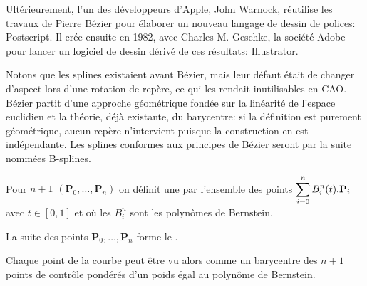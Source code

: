 \begin{histoire}
Ultérieurement, l'un des développeurs d'Apple, John Warnock, 
réutilise les travaux de Pierre Bézier pour élaborer un nouveau langage de dessin de polices: Postscript.
Il crée ensuite en 1982, avec Charles M. Geschke, 
la société Adobe pour lancer un logiciel de dessin dérivé de ces résultats: Illustrator.

\medskip
Notons que les splines existaient avant Bézier,
mais leur défaut était de changer d'aspect lors d'une rotation de repère, ce qui les rendait inutilisables 
en CAO. 
Bézier partit d'une approche géométrique fondée sur la linéarité de l'espace euclidien et la 
théorie, déjà existante, du barycentre: si la définition est purement géométrique, aucun 
repère n'intervient puisque la construction en est indépendante.
Les splines conformes aux principes de Bézier seront par la suite nommées B-splines.
\end{histoire}

\medskip
Pour $n+1$  $(\mathbf{P}_0, \dots, \mathbf{P}_n)$ on définit 
une  par l'ensemble des points $\displaystyle\sum_{i = 0}^n B_i^n(t) . \mathbf{P}_i$ 
avec $t \in[0, 1]$ et où les $B_i^n$ sont les polynômes de Bernstein.

La suite des points $\mathbf{P}_0, \dots, \mathbf{P}_n$ forme le .

\medskip
Chaque point de la courbe peut être vu alors comme un barycentre des $n+1$ points de contrôle
pondérés d'un poids égal au polynôme de Bernstein. 

